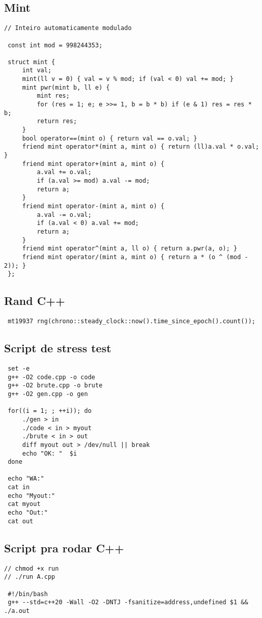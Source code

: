 \documentclass[11pt, a4paper, twoside]{article}
\begin{document}
\subsection{Mint}
\begin{lstlisting}
// Inteiro automaticamente modulado

 const int mod = 998244353;
 
 struct mint {
     int val;
     mint(ll v = 0) { val = v % mod; if (val < 0) val += mod; }
     mint pwr(mint b, ll e) {
         mint res;
         for (res = 1; e; e >>= 1, b = b * b) if (e & 1) res = res * b;
         return res;
     }
     bool operator==(mint o) { return val == o.val; }
     friend mint operator*(mint a, mint o) { return (ll)a.val * o.val; }
     friend mint operator+(mint a, mint o) {
         a.val += o.val;
         if (a.val >= mod) a.val -= mod;
         return a;
     }
     friend mint operator-(mint a, mint o) {
         a.val -= o.val;
         if (a.val < 0) a.val += mod;
         return a;
     }
     friend mint operator^(mint a, ll o) { return a.pwr(a, o); }
     friend mint operator/(mint a, mint o) { return a * (o ^ (mod - 2)); }
 };
\end{lstlisting}

\subsection{Rand C++}
\begin{lstlisting}
 mt19937 rng(chrono::steady_clock::now().time_since_epoch().count());
\end{lstlisting}

\subsection{Script de stress test}
\begin{lstlisting}
 set -e
 g++ -O2 code.cpp -o code
 g++ -O2 brute.cpp -o brute
 g++ -O2 gen.cpp -o gen
 
 for((i = 1; ; ++i)); do
     ./gen > in
     ./code < in > myout
     ./brute < in > out
     diff myout out > /dev/null || break
     echo "OK: "  $i
 done
 
 echo "WA:"
 cat in
 echo "Myout:"
 cat myout
 echo "Out:"
 cat out
\end{lstlisting}

\subsection{Script pra rodar C++}
\begin{lstlisting}
// chmod +x run
// ./run A.cpp

 #!/bin/bash
 g++ --std=c++20 -Wall -O2 -DNTJ -fsanitize=address,undefined $1 && ./a.out
\end{lstlisting}
\end{document}
